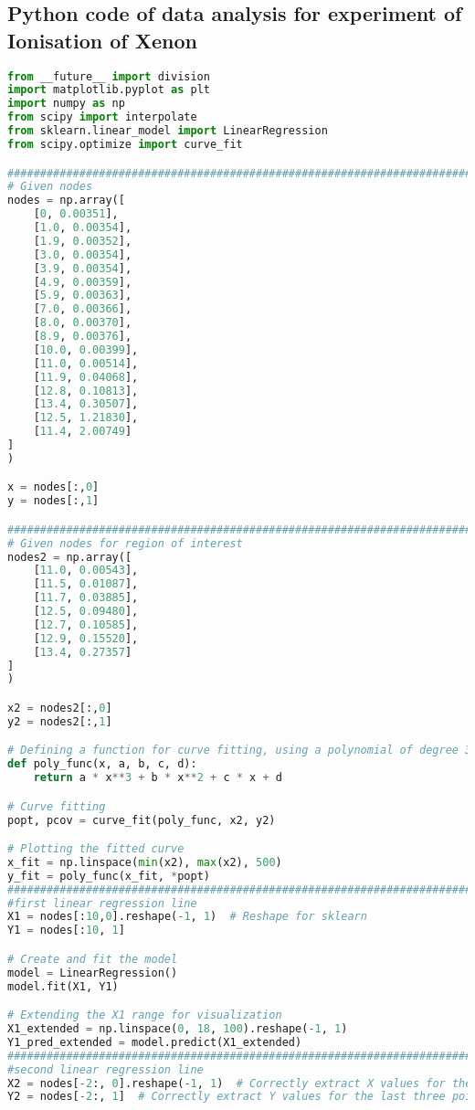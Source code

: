 \documentclass[a4paper,11pt]{article}
\begin{document}
\subsection*{Python code of data analysis for experiment of Ionisation of Xenon}
\begin{lstlisting}[language=Python]
from __future__ import division
import matplotlib.pyplot as plt
import numpy as np
from scipy import interpolate
from sklearn.linear_model import LinearRegression
from scipy.optimize import curve_fit

##############################################################################
# Given nodes
nodes = np.array([
    [0, 0.00351],
    [1.0, 0.00354],
    [1.9, 0.00352],
    [3.0, 0.00354],
    [3.9, 0.00354],
    [4.9, 0.00359],
    [5.9, 0.00363],
    [7.0, 0.00366],
    [8.0, 0.00370],
    [8.9, 0.00376],
    [10.0, 0.00399],
    [11.0, 0.00514],
    [11.9, 0.04068],
    [12.8, 0.10813],
    [13.4, 0.30507],
    [12.5, 1.21830],
    [11.4, 2.00749]
]  
)

x = nodes[:,0]
y = nodes[:,1]

############################################################################
# Given nodes for region of interest
nodes2 = np.array([
    [11.0, 0.00543],
    [11.5, 0.01087],
    [11.7, 0.03885],
    [12.5, 0.09480],
    [12.7, 0.10585],
    [12.9, 0.15520],
    [13.4, 0.27357]
]  
)

x2 = nodes2[:,0]
y2 = nodes2[:,1]

# Defining a function for curve fitting, using a polynomial of degree 3 as an example
def poly_func(x, a, b, c, d):
    return a * x**3 + b * x**2 + c * x + d

# Curve fitting
popt, pcov = curve_fit(poly_func, x2, y2)

# Plotting the fitted curve
x_fit = np.linspace(min(x2), max(x2), 500)
y_fit = poly_func(x_fit, *popt)
############################################################################
#first linear regression line
X1 = nodes[:10,0].reshape(-1, 1)  # Reshape for sklearn
Y1 = nodes[:10, 1]

# Create and fit the model
model = LinearRegression()
model.fit(X1, Y1)

# Extending the X1 range for visualization
X1_extended = np.linspace(0, 18, 100).reshape(-1, 1)
Y1_pred_extended = model.predict(X1_extended)
#############################################################################
#second linear regression line
X2 = nodes[-2:, 0].reshape(-1, 1)  # Correctly extract X values for the last three points
Y2 = nodes[-2:, 1]  # Correctly extract Y values for the last three points


\end{lstlisting}
\end{document}
